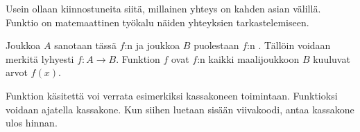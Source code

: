 Usein ollaan kiinnostuneita siitä, millainen yhteys on kahden asian välillä.
Funktio on matemaattinen työkalu näiden yhteyksien tarkastelemiseen.

  Joukkoa $A$ sanotaan tässä $f$:n  ja joukkoa $B$ puolestaan $f$:n . Tällöin voidaan merkitä lyhyesti $f\colon A \to B$. Funktion $f$  ovat $f$:n kaikki maalijoukkoon $B$ kuuluvat arvot $f(x)$.
   
  
Funktion käsitettä voi verrata esimerkiksi kassakoneen toimintaan. Funktioksi voidaan ajatella kassakone. Kun siihen luetaan sisään viivakoodi, antaa kassakone ulos hinnan.

